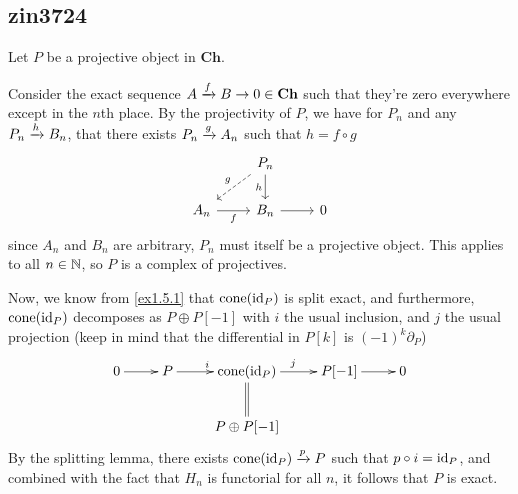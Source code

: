 \subsection{zin3724} \label{ex2.2.1}
Let $P$ be a projective object in $\mathbf{Ch}$.

Consider the exact sequence $A\xrightarrow{f} B\rightarrow 0\in\mathbf{Ch}$ such that they're zero everywhere except in the $n$th place. By the projectivity of $P$, we have for $P_n$ and any $P_n\xrightarrow{h}B_n$, that there exists $P_n\xrightarrow{g}A_n$ such that $h=f\circ g$
\[\begin{tikzcd}
    & P_n \arrow[d, "h"'] \arrow[ld, "g"', dashed] &   \\
A_n \arrow[r, "f"'] & B_n \arrow[r]                                  & 0
\end{tikzcd}\]
since $A_n$ and $B_n$ are arbitrary, $P_n$ must itself be a projective object. This applies to all $n\in\mathbb{N}$, so $P$ is a complex of projectives.

Now, we know from \ref{ex1.5.1} that $\operatorname{cone}(\operatorname{\operatorname{id}}_P)$ is split exact, and furthermore, $\operatorname{cone}(\operatorname{\operatorname{id}}_P)$ decomposes as $P\oplus P[-1]$ with $i$ the usual inclusion, and $j$ the usual projection (keep in mind that the differential in $P[k]$ is $(-1)^k\partial_P$)
\[\xymatrix{
    0 \ar@{->}[r] & P \ar@{->}[r]^{i} & \operatorname{cone}(\operatorname{id}_P) \ar@{->}[r]^{j} \ar@{=}[d] & P[-1] \ar@{->}[r] & 0 \\
     &  & P\oplus P[-1] &  & 
    }\]
By the splitting lemma, there exists $\operatorname{cone}(\operatorname{\operatorname{id}}_P)\xrightarrow{p}P$ such that $p\circ i=\operatorname{\operatorname{id}}_P$, and combined with the fact that $H_n$ is functorial for all $n$, it follows that $P$ is exact.

